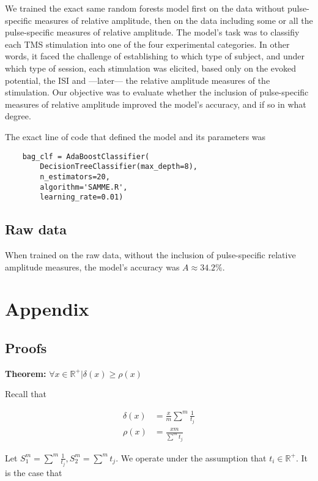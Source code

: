 \documentclass{article}
\begin{document}
We trained the exact same random forests model first on the data without pulse-specific measures of relative amplitude, then on the data including some or all the pulse-specific measures of relative amplitude. The model's task was to classifiy each TMS stimulation into one of the four experimental categories. In other words, it faced the challenge of establishing to which type of subject, and under which type of session, each stimulation was elicited, based only on the evoked potential, the ISI and ---later--- the relative amplitude measures of the stimulation. Our objective was to evaluate whether the inclusion of pulse-specific measures of relative amplitude improved the model's accuracy, and if so in what degree. 

The exact line of code that defined the model and its parameters was

\begin{verbatim}
    bag_clf = AdaBoostClassifier(
        DecisionTreeClassifier(max_depth=8), 
        n_estimators=20, 
        algorithm='SAMME.R', 
        learning_rate=0.01)
\end{verbatim}


\subsection{Raw data}

When trained on the raw data, without the inclusion of pulse-specific relative amplitude measures, the model's accuracy was $A\approx34.2 \%$.

\section{Appendix}

\subsection*{Proofs}

\textbf{Theorem: } $\forall x \in \mathbb{R}^+|\delta(x) \geq \rho(x)$

Recall that

\begin{align} \delta(x) &= \frac{x}{m}\sum^m\frac{1}{t_j} \\ \rho(x) &= \frac{xm}{\sum^m t_j} \end{align}


Let $S_1^m = \sum^m\frac{1}{t_j}, S_2^m= \sum^m t_j$. We operate under the assumption that $t_i \in \mathbb{R}^+$. It is the case that
\end{document}

